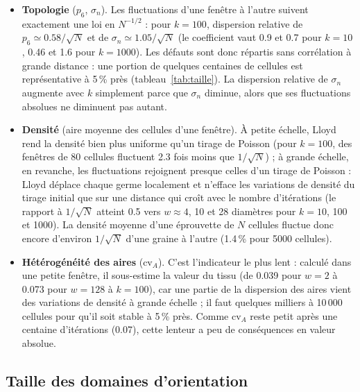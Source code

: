 \documentclass[10pt,a4paper]{article}
\begin{document}
\begin{itemize}
  \item \textbf{Topologie} ($p_6$, $\sigma_n$). Les fluctuations d'une fenêtre à l'autre suivent exactement une loi en
    $N^{-1/2}$ : pour $k=100$, dispersion relative de $p_6\simeq0.58/\sqrt N$ et de $\sigma_n\simeq1.05/\sqrt N$ (le
    coefficient vaut 0.9 et 0.7 pour $k=10$, 0.46 et 1.6 pour $k=1000$). Les défauts sont donc répartis sans
    corrélation à grande distance : une portion de quelques centaines de cellules est représentative à 5\,\%
    près (tableau~\ref{tab:taille}). La dispersion relative de $\sigma_n$ augmente avec $k$ simplement parce que
    $\sigma_n$ diminue, alors que ses fluctuations absolues ne diminuent pas autant.
  \item \textbf{Densité} (aire moyenne des cellules d'une fenêtre). À petite échelle, Lloyd rend la densité bien
    plus uniforme qu'un tirage de Poisson (pour $k=100$, des fenêtres de 80 cellules fluctuent 2.3 fois moins que
    $1/\sqrt N$) ; à grande échelle, en revanche, les fluctuations rejoignent presque celles d'un tirage de
    Poisson : Lloyd déplace chaque germe localement et n'efface les variations de densité du tirage initial que sur
    une distance qui croît avec le nombre d'itérations (le rapport à $1/\sqrt N$ atteint 0.5 vers
    $w\approx4$, 10 et 28 diamètres pour $k=10$, 100 et 1000). La densité moyenne d'une éprouvette de $N$ cellules
    fluctue donc encore d'environ $1/\sqrt N$ d'une graine à l'autre (1.4\,\% pour 5000 cellules).
  \item \textbf{Hétérogénéité des aires} ($\mathrm{cv}_A$). C'est l'indicateur le plus lent : calculé dans une petite
    fenêtre, il sous-estime la valeur du tissu (de 0.039 pour $w=2$ à 0.073 pour $w=128$ à $k=100$), car une partie de
    la dispersion des aires vient des variations de densité à grande échelle ; il faut quelques milliers à
    10\,000 cellules pour qu'il soit stable à 5\,\% près. Comme $\mathrm{cv}_A$ reste petit après une centaine
    d'itérations (0.07), cette lenteur a peu de conséquences en valeur absolue.
\end{itemize}

\subsection{Taille des domaines d'orientation}\label{sec:domaines}
\end{document}
